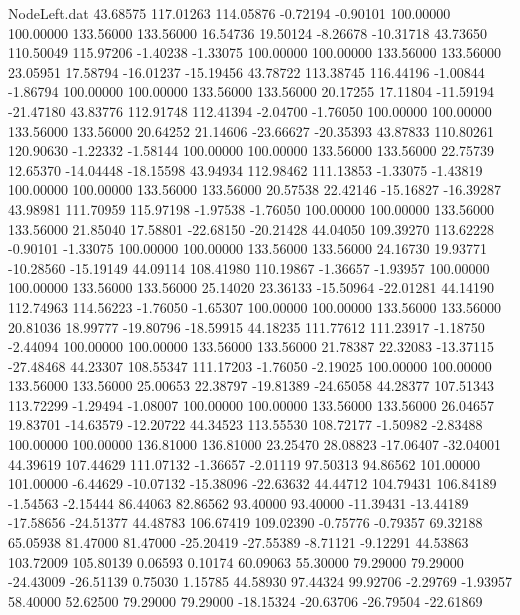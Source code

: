\begin{filecontents}{NodeLeft.dat}
  43.68575  117.01263  114.05876    -0.72194   -0.90101  100.00000  100.00000  133.56000  133.56000   16.54736   19.50124   -8.26678  -10.31718
  43.73650  110.50049  115.97206    -1.40238   -1.33075  100.00000  100.00000  133.56000  133.56000   23.05951   17.58794  -16.01237  -15.19456
  43.78722  113.38745  116.44196    -1.00844   -1.86794  100.00000  100.00000  133.56000  133.56000   20.17255   17.11804  -11.59194  -21.47180
  43.83776  112.91748  112.41394    -2.04700   -1.76050  100.00000  100.00000  133.56000  133.56000   20.64252   21.14606  -23.66627  -20.35393
  43.87833  110.80261  120.90630    -1.22332   -1.58144  100.00000  100.00000  133.56000  133.56000   22.75739   12.65370  -14.04448  -18.15598
  43.94934  112.98462  111.13853    -1.33075   -1.43819  100.00000  100.00000  133.56000  133.56000   20.57538   22.42146  -15.16827  -16.39287
  43.98981  111.70959  115.97198    -1.97538   -1.76050  100.00000  100.00000  133.56000  133.56000   21.85040   17.58801  -22.68150  -20.21428
  44.04050  109.39270  113.62228    -0.90101   -1.33075  100.00000  100.00000  133.56000  133.56000   24.16730   19.93771  -10.28560  -15.19149
  44.09114  108.41980  110.19867    -1.36657   -1.93957  100.00000  100.00000  133.56000  133.56000   25.14020   23.36133  -15.50964  -22.01281
  44.14190  112.74963  114.56223    -1.76050   -1.65307  100.00000  100.00000  133.56000  133.56000   20.81036   18.99777  -19.80796  -18.59915
  44.18235  111.77612  111.23917    -1.18750   -2.44094  100.00000  100.00000  133.56000  133.56000   21.78387   22.32083  -13.37115  -27.48468
  44.23307  108.55347  111.17203    -1.76050   -2.19025  100.00000  100.00000  133.56000  133.56000   25.00653   22.38797  -19.81389  -24.65058
  44.28377  107.51343  113.72299    -1.29494   -1.08007  100.00000  100.00000  133.56000  133.56000   26.04657   19.83701  -14.63579  -12.20722
  44.34523  113.55530  108.72177    -1.50982   -2.83488  100.00000  100.00000  136.81000  136.81000   23.25470   28.08823  -17.06407  -32.04001
  44.39619  107.44629  111.07132    -1.36657   -2.01119   97.50313   94.86562  101.00000  101.00000   -6.44629  -10.07132  -15.38096  -22.63632
  44.44712  104.79431  106.84189    -1.54563   -2.15444   86.44063   82.86562   93.40000   93.40000  -11.39431  -13.44189  -17.58656  -24.51377
  44.48783  106.67419  109.02390    -0.75776   -0.79357   69.32188   65.05938   81.47000   81.47000  -25.20419  -27.55389   -8.71121   -9.12291
  44.53863  103.72009  105.80139     0.06593    0.10174   60.09063   55.30000   79.29000   79.29000  -24.43009  -26.51139    0.75030    1.15785
  44.58930   97.44324   99.92706    -2.29769   -1.93957   58.40000   52.62500   79.29000   79.29000  -18.15324  -20.63706  -26.79504  -22.61869

\end{filecontents}
